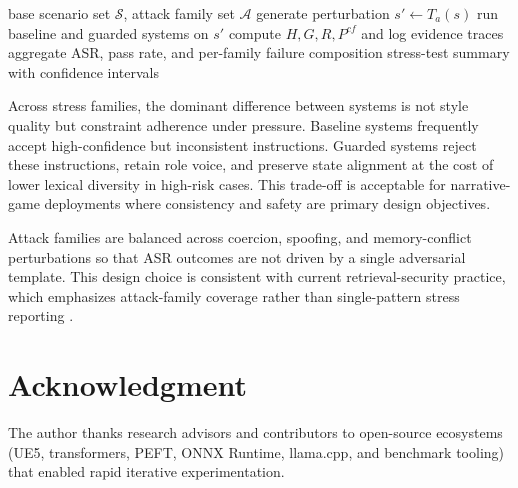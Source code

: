 ﻿\documentclass[a4paper,12pt]{article}
\begin{document}
\begin{algorithm}[H]
\caption{Counterfactual robustness evaluation}
\begin{algorithmic}[1]
\Require base scenario set $\mathcal{S}$, attack family set $\mathcal{A}$
    \State generate perturbation $s'\gets T_a(s)$
    \State run baseline and guarded systems on $s'$
    \State compute $H, G, R, P^{cf}$ and log evidence traces
  \EndFor
\EndFor
\State aggregate ASR, pass rate, and per-family failure composition
\State \Return stress-test summary with confidence intervals
\end{algorithmic}
\end{algorithm}

Across stress families, the dominant difference between systems is not style quality but constraint adherence under pressure. Baseline systems frequently accept high-confidence but inconsistent instructions. Guarded systems reject these instructions, retain role voice, and preserve state alignment at the cost of lower lexical diversity in high-risk cases. This trade-off is acceptable for narrative-game deployments where consistency and safety are primary design objectives.

Attack families are balanced across coercion, spoofing, and memory-conflict perturbations so that ASR outcomes are not driven by a single adversarial template. This design choice is consistent with current retrieval-security practice, which emphasizes attack-family coverage rather than single-pattern stress reporting \cite{Zou2025PoisonedRAG,Chaturvedi2025AIP}.

\section*{Acknowledgment}
The author thanks research advisors and contributors to open-source ecosystems (UE5, transformers, PEFT, ONNX Runtime, llama.cpp, and benchmark tooling) that enabled rapid iterative experimentation.
\end{document}
